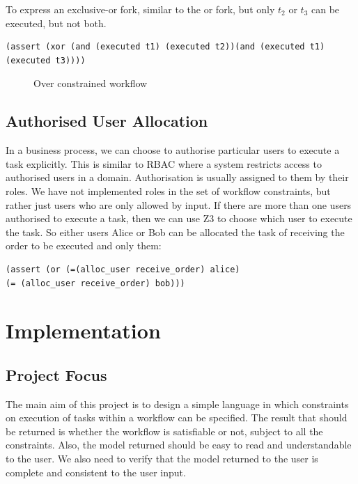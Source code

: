 \documentclass[a4paper]{report}
\begin{document}
To express an exclusive-or fork, similar to the or fork, but only $t_2$ or $t_3$ can be executed, but not both.
\begin{lstlisting}[frame=single]
(assert (xor (and (executed t1) (executed t2))(and (executed t1) (executed t3))))
\end{lstlisting}

\begin{figure}[!h]
\centering
{}
\caption{Over constrained workflow}
\label{fig:Over constrained workflow}
\end{figure}

\section{Authorised User Allocation}
In a business process, we can choose to authorise particular users to execute a task explicitly. This is similar to RBAC\cite{rbac} where a system restricts access to authorised users in a domain. Authorisation is usually assigned to them by their roles. We have not implemented roles in the set of workflow constraints, but rather just users who are only allowed by input. If there are more than one users authorised to execute a task, then we can use Z3 to choose which user to execute the task. So either users Alice or Bob can be allocated the task of receiving the order to be executed and only them:
\begin{lstlisting}[frame=single]
(assert (or (=(alloc_user receive_order) alice) 
(= (alloc_user receive_order) bob)))
\end{lstlisting}


\chapter{Implementation}
\section{Project Focus}
The main aim of this project is to design a simple language in which constraints on execution of tasks within a workflow can be specified. The result that should be returned is whether the workflow is satisfiable or not, subject to all the constraints. Also, the model returned should be easy to read and understandable to the user. We also need to verify that the model returned to the user is complete and consistent to the user input.\\
\end{document}
